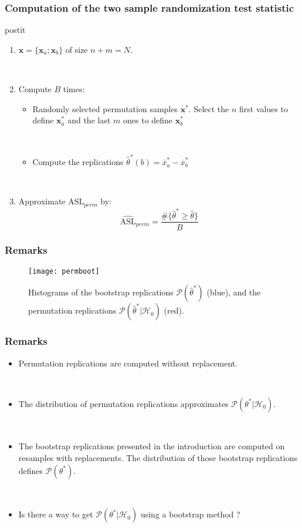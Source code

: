 \frame
{
\frametitle{Computation of the two sample randomization test statistic}

\begin{beamercolorbox}[wd=\linewidth, rounded=true,shadow=true]{postit}

\begin{enumerate}
\item $\mathbf{x}=\lbrace \mathbf{x}_a;\mathbf{x}_b \rbrace$ of size $n+m=N$. 

\

\item Compute $B$ times:


\begin{itemize}
\item Randomly selected permutation samples $\mathbf{x}^{*}$. Select the $n$ first values to define $\mathbf{x}^{*}_a$ and the last $m$ ones to define $\mathbf{x}^{*}_b$

\ 

\item Compute the replications $\hat{\theta}^{*}(b)=\overline{x}_{a}^{*}-\overline{x}_{b}^{*}$
\end{itemize}

\

\item Approximate $\mathrm{ASL}_{perm}$ by:
$$
\widehat{\mathrm{ASL}}_{perm}= \frac{\# \lbrace \hat{\theta}^{*} \geq \hat{\theta} \rbrace}{B}
$$
\end{enumerate}

\end{beamercolorbox}
}
\frame
{
\frametitle{Remarks}

\begin{figure}[!h]
\texttt{[image: permboot]}
\caption{Histograms of the bootstrap replications $\mathcal{P}(\hat{\theta}^{*})$ (blue), and the permutation replications $\mathcal{P}(\hat{\theta}^{*}|\mathcal{H}_{0})$ (red). }
\end{figure}
}
\frame
{
\frametitle{Remarks} 

\begin{itemize}

\item Permutation replications are computed  without replacement.

\

\item The  distribution of permutation replications approximates $\mathcal{P}(\theta^{*}|\mathcal{H}_0)$.

\

\item The bootstrap replications presented in the introduction are computed on resamples with replacements. The distribution of those bootstrap replications defines $\mathcal{P}(\theta^{*})$. 

\

\item Is there a way to get $\mathcal{P}(\theta^{*}|\mathcal{H}_0)$ using a bootstrap method ?

\end{itemize}

}


